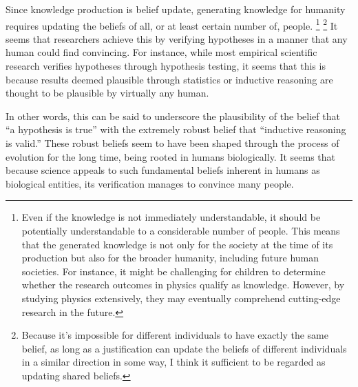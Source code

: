 Since knowledge production is belief update, generating knowledge for humanity requires updating the beliefs of all, or at least certain number of, people. \footnote{
Even if the knowledge is not immediately understandable, it should be potentially understandable to a considerable number of people. This means that the generated knowledge is not only for the society at the time of its production but also for the broader humanity, including future human societies. For instance, it might be challenging for children to determine whether the research outcomes in physics qualify as knowledge. However, by studying physics extensively, they may eventually comprehend cutting-edge research in the future. 
} \footnote{
Because it's impossible for different individuals to have exactly the same belief, as long as a justification can update the beliefs of different individuals in a similar direction in some way, I think it sufficient to be regarded as updating shared beliefs.
} 
It seems that researchers achieve this by verifying hypotheses in a manner that any human could find convincing. For instance, while most empirical scientific research verifies hypotheses through hypothesis testing, it seems that this is because results deemed plausible through statistics or inductive reasoning are thought to be plausible by virtually any human.



In other words, this can be said to underscore the plausibility of the belief that ``a hypothesis is true'' with the extremely robust belief that ``inductive reasoning is valid.'' These robust beliefs seem to have been shaped through the process of evolution for the long time, being rooted in humans biologically. It seems that because science appeals to such fundamental beliefs inherent in humans as biological entities, its verification manages to convince many people.

